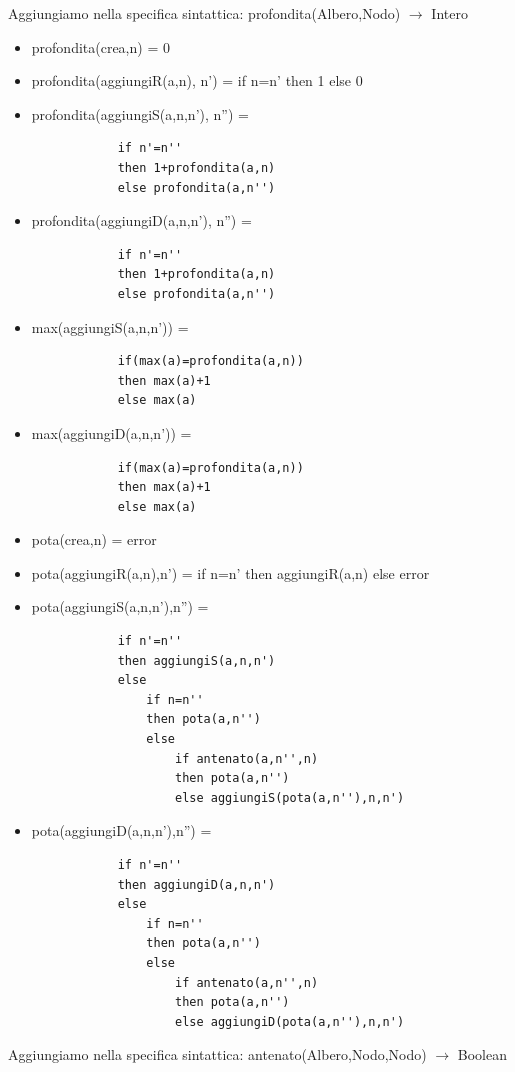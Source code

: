 \documentclass{article}
\begin{document}
	Aggiungiamo nella specifica sintattica: profondita(Albero,Nodo) $\rightarrow$ Intero
	\begin{itemize}
		\item profondita(crea,n) = 0
		\item profondita(aggiungiR(a,n), n') = if n=n' then 1 else 0
		\item profondita(aggiungiS(a,n,n'), n'') = 
		\begin{verbatim}
			if n'=n''
			then 1+profondita(a,n)
			else profondita(a,n'')
		\end{verbatim}
		\item profondita(aggiungiD(a,n,n'), n'') = 
		\begin{verbatim}
			if n'=n''
			then 1+profondita(a,n)
			else profondita(a,n'')
		\end{verbatim}
		\item max(aggiungiS(a,n,n')) = 
		\begin{verbatim}
			if(max(a)=profondita(a,n))
			then max(a)+1
			else max(a)
		\end{verbatim}
		\item max(aggiungiD(a,n,n')) = 
		\begin{verbatim}
			if(max(a)=profondita(a,n))
			then max(a)+1
			else max(a)
		\end{verbatim}
		\item pota(crea,n) = error
		\item pota(aggiungiR(a,n),n') = if n=n' then aggiungiR(a,n) else error
		\item pota(aggiungiS(a,n,n'),n'') = 
		\begin{verbatim}
			if n'=n'' 
			then aggiungiS(a,n,n') 
			else 
				if n=n''
				then pota(a,n'')
				else 
					if antenato(a,n'',n)
					then pota(a,n'')
					else aggiungiS(pota(a,n''),n,n')
		\end{verbatim}
		\item pota(aggiungiD(a,n,n'),n'') = 
		\begin{verbatim}
			if n'=n'' 
			then aggiungiD(a,n,n') 
			else 
				if n=n''
				then pota(a,n'')
				else 
					if antenato(a,n'',n)
					then pota(a,n'')
					else aggiungiD(pota(a,n''),n,n')
		\end{verbatim}
	\end{itemize}
	Aggiungiamo nella specifica sintattica: antenato(Albero,Nodo,Nodo) $\rightarrow$ Boolean
\end{document}

